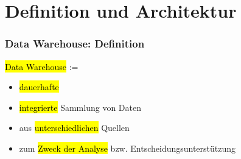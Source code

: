 \newlength{\textAreaHeight}
\setlength{\textAreaHeight}{0.75\paperheight}

\section{Definition und Architektur}

\begin{frame}
    \frametitle{Data Warehouse: Definition}
    
    \begin{notebox}
    \hl{Data Warehouse} :=
    \begin{itemize}
    \item \hl{dauerhafte}
    \item \hl{integrierte} Sammlung von Daten
    \item aus \hl{unterschiedlichen} Quellen
    \item zum \hl{Zweck der Analyse} bzw. Entscheidungsunterstützung
    \end{itemize}
    \end{notebox}
    
    \end{frame}

